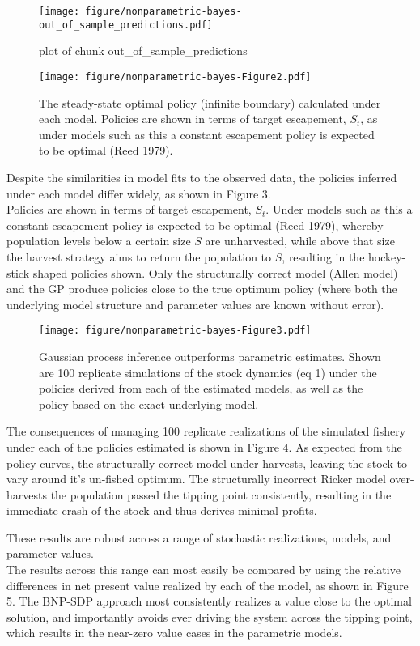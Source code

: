 \documentclass[author-year, review]{elsarticle} %
\makeatletter
\def\maxwidth{\ifdim\Gin@nat@width>\linewidth\linewidth
\else\Gin@nat@width\fi}
\let\Oldincludegraphics\includegraphics
\renewcommand{\includegraphics}[1]{\Oldincludegraphics[width=\maxwidth]{#1}}
\makeatother
\begin{document}
\begin{figure}[htbp]
\centering
\texttt{[image: figure/nonparametric-bayes-out\_of\_sample\_predictions.pdf]}
\caption{plot of chunk out\_of\_sample\_predictions}
\end{figure}

\begin{figure}[htbp]
\centering
\texttt{[image: figure/nonparametric-bayes-Figure2.pdf]}
\caption{The steady-state optimal policy (infinite boundary) calculated
under each model. Policies are shown in terms of target escapement,
$S_t$, as under models such as this a constant escapement policy is
expected to be optimal (Reed 1979).}
\end{figure}

Despite the similarities in model fits to the observed data, the
policies inferred under each model differ widely, as shown in Figure
3.\\Policies are shown in terms of target escapement, $S_t$. Under
models such as this a constant escapement policy is expected to be
optimal (Reed 1979), whereby population levels below a certain size $S$
are unharvested, while above that size the harvest strategy aims to
return the population to $S$, resulting in the hockey-stick shaped
policies shown. Only the structurally correct model (Allen model) and
the GP produce policies close to the true optimum policy (where both the
underlying model structure and parameter values are known without
error).

\begin{figure}[htbp]
\centering
\texttt{[image: figure/nonparametric-bayes-Figure3.pdf]}
\caption{Gaussian process inference outperforms parametric estimates.
Shown are 100 replicate simulations of the stock dynamics (eq 1) under
the policies derived from each of the estimated models, as well as the
policy based on the exact underlying model.}
\end{figure}

The consequences of managing 100 replicate realizations of the simulated
fishery under each of the policies estimated is shown in Figure 4. As
expected from the policy curves, the structurally correct model
under-harvests, leaving the stock to vary around it's un-fished optimum.
The structurally incorrect Ricker model over-harvests the population
passed the tipping point consistently, resulting in the immediate crash
of the stock and thus derives minimal profits.

These results are robust across a range of stochastic realizations,
models, and parameter values.\\The results across this range can most
easily be compared by using the relative differences in net present
value realized by each of the model, as shown in Figure 5. The BNP-SDP
approach most consistently realizes a value close to the optimal
solution, and importantly avoids ever driving the system across the
tipping point, which results in the near-zero value cases in the
parametric models.
\end{document}
